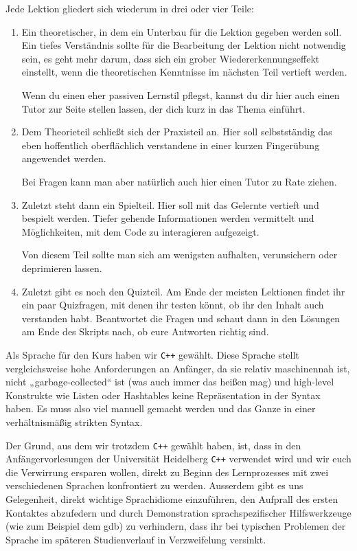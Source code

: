 \documentclass{vorkurs}
\newcommand{\swname}[1]{\texttt{#1}\xspace}
\newcommand{\Cpp}{\swname{C++}}
\begin{document}
Jede Lektion gliedert sich wiederum in drei oder vier Teile:
\begin{enumerate}
    \item Ein theoretischer, in dem ein Unterbau für die Lektion gegeben werden
        soll.  Ein tiefes Verständnis sollte für die Bearbeitung der Lektion
        nicht notwendig sein, es geht mehr darum, dass sich ein grober
        Wiedererkennungseffekt einstellt, wenn die theoretischen Kenntnisse im
        nächsten Teil vertieft werden.

        Wenn du einen eher passiven Lernstil pflegst, kannst du dir hier auch
        einen Tutor zur Seite stellen lassen, der dich kurz in das Thema
        einführt.
    \item Dem Theorieteil schließt sich der Praxisteil an.
        Hier soll selbstständig das eben hoffentlich oberflächlich verstandene
        in einer kurzen Fingerübung angewendet werden.

        Bei Fragen kann man aber natürlich auch hier einen Tutor zu Rate
        ziehen.
    \item Zuletzt steht dann ein Spielteil. Hier soll mit das Gelernte vertieft und bespielt werden.
        Tiefer gehende Informationen werden vermittelt und Möglichkeiten, mit
        dem Code zu interagieren aufgezeigt.

        Von diesem Teil sollte man sich am wenigsten aufhalten, verunsichern
        oder deprimieren lassen.
        
    \item Zuletzt gibt es noch den Quizteil. Am Ende der meisten Lektionen findet ihr ein paar Quizfragen, mit denen ihr testen könnt, ob ihr den Inhalt auch verstanden habt. Beantwortet die Fragen und schaut dann in den Lösungen am Ende des Skripts nach, ob eure Antworten richtig sind. 
\end{enumerate}

Als Sprache für den Kurs haben wir \Cpp gewählt.  Diese Sprache stellt
vergleichsweise hohe Anforderungen an Anfänger, da sie relativ maschinennah
ist, nicht „garbage-collected“ ist (was auch immer das heißen mag) und
high-level Konstrukte wie Listen oder Hashtables keine Repräsentation in der
Syntax haben.  Es muss also viel manuell gemacht werden und das Ganze in einer
verhältnismäßig strikten Syntax.

Der Grund, aus dem wir trotzdem \Cpp gewählt haben, ist, dass in den
Anfängervorlesungen der Universität Heidelberg \Cpp verwendet wird und wir euch
die Verwirrung ersparen wollen, direkt zu Beginn des Lernprozesses mit zwei
verschiedenen Sprachen konfrontiert zu werden.  Ausserdem gibt es uns
Gelegenheit, direkt wichtige Sprachidiome einzuführen, den Aufprall des ersten
Kontaktes abzufedern und durch Demonstration sprachspezifischer Hilfswerkzeuge
(wie zum Beispiel dem gdb) zu verhindern, dass ihr bei typischen Problemen der
Sprache im späteren Studienverlauf in Verzweifelung versinkt.
\end{document}
